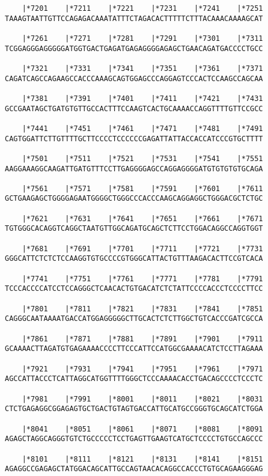 \documentclass{article}
\begin{document}
\begin{Verbatim}
    |*7201    |*7211    |*7221    |*7231    |*7241    |*7251
TAAAGTAATTGTTCCAGAGACAAATATTTCTAGACACTTTTTCTTTACAAACAAAAGCAT
  
    |*7261    |*7271    |*7281    |*7291    |*7301    |*7311
TCGGAGGGAGGGGGATGGTGACTGAGATGAGAGGGGAGAGCTGAACAGATGACCCCTGCC
  
    |*7321    |*7331    |*7341    |*7351    |*7361    |*7371
CAGATCAGCCAGAAGCCACCCAAAGCAGTGGAGCCCAGGAGTCCCACTCCAAGCCAGCAA
  
    |*7381    |*7391    |*7401    |*7411    |*7421    |*7431
GCCGAATAGCTGATGTGTTGCCACTTTCCAAGTCACTGCAAAACCAGGTTTTGTTCCGCC
  
    |*7441    |*7451    |*7461    |*7471    |*7481    |*7491
CAGTGGATTCTTGTTTTGCTTCCCCTCCCCCCGAGATTATTACCACCATCCCGTGCTTTT
  
    |*7501    |*7511    |*7521    |*7531    |*7541    |*7551
AAGGAAAGGCAAGATTGATGTTTCCTTGAGGGGAGCCAGGAGGGGATGTGTGTGTGCAGA
  
    |*7561    |*7571    |*7581    |*7591    |*7601    |*7611
GCTGAAGAGCTGGGGAGAATGGGGCTGGGCCCACCCAAGCAGGAGGCTGGGACGCTCTGC
  
    |*7621    |*7631    |*7641    |*7651    |*7661    |*7671
TGTGGGCACAGGTCAGGCTAATGTTGGCAGATGCAGCTCTTCCTGGACAGGCCAGGTGGT
  
    |*7681    |*7691    |*7701    |*7711    |*7721    |*7731
GGGCATTCTCTCTCCAAGGTGTGCCCCGTGGGCATTACTGTTTAAGACACTTCCGTCACA
  
    |*7741    |*7751    |*7761    |*7771    |*7781    |*7791
TCCCACCCCATCCTCCAGGGCTCAACACTGTGACATCTCTATTCCCCACCCTCCCCTTCC
  
    |*7801    |*7811    |*7821    |*7831    |*7841    |*7851
CAGGGCAATAAAATGACCATGGAGGGGGCTTGCACTCTCTTGGCTGTCACCCGATCGCCA
  
    |*7861    |*7871    |*7881    |*7891    |*7901    |*7911
GCAAAACTTAGATGTGAGAAAACCCCTTCCCATTCCATGGCGAAAACATCTCCTTAGAAA
  
    |*7921    |*7931    |*7941    |*7951    |*7961    |*7971
AGCCATTACCCTCATTAGGCATGGTTTTGGGCTCCCAAAACACCTGACAGCCCCTCCCTC
  
    |*7981    |*7991    |*8001    |*8011    |*8021    |*8031
CTCTGAGAGGCGGAGAGTGCTGACTGTAGTGACCATTGCATGCCGGGTGCAGCATCTGGA
  
    |*8041    |*8051    |*8061    |*8071    |*8081    |*8091
AGAGCTAGGCAGGGTGTCTGCCCCCTCCTGAGTTGAAGTCATGCTCCCCTGTGCCAGCCC
  
    |*8101    |*8111    |*8121    |*8131    |*8141    |*8151
AGAGGCCGAGAGCTATGGACAGCATTGCCAGTAACACAGGCCACCCTGTGCAGAAGGGAG
  

\end{Verbatim}
\end{document}
